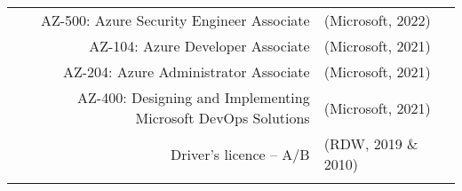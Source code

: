 \begin{tabular}{@{} r l c @{}}
AZ-500: Azure Security Engineer Associate & (Microsoft, 2022) & \\
AZ-104: Azure Developer Associate & (Microsoft, 2021) & \\
AZ-204: Azure Administrator Associate & (Microsoft, 2021) & \\
AZ-400: Designing and Implementing Microsoft DevOps Solutions & (Microsoft, 2021) & \\
Driver’s licence – A/B & (RDW, 2019 \& 2010) & \(\left.\begin{array}{c} \\ \end{array}\right\}\) Other \\
\end{tabular}
